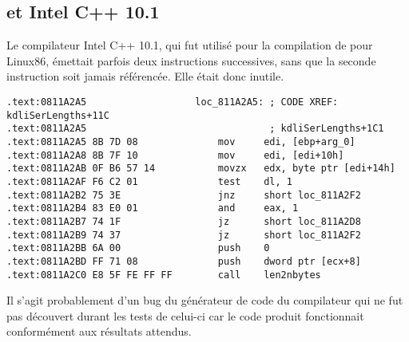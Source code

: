 ﻿
\label{anomaly:Intel}
\myindex{\CompilerAnomaly}

\subsection{ et Intel C++ 10.1}

\myindex{\oracle}

Le compilateur Intel C++ 10.1, qui fut utilisé pour la compilation de  pour Linux86, 
émettait parfois deux instructions \JZ successives, sans que la seconde instruction soit jamais 
référencée. Elle était donc inutile.



\begin{lstlisting}[caption=from the same code,style=customasmx86]
.text:0811A2A5                   loc_811A2A5: ; CODE XREF: kdliSerLengths+11C
.text:0811A2A5                                ; kdliSerLengths+1C1
.text:0811A2A5 8B 7D 08              mov     edi, [ebp+arg_0]
.text:0811A2A8 8B 7F 10              mov     edi, [edi+10h]
.text:0811A2AB 0F B6 57 14           movzx   edx, byte ptr [edi+14h]
.text:0811A2AF F6 C2 01              test    dl, 1
.text:0811A2B2 75 3E                 jnz     short loc_811A2F2
.text:0811A2B4 83 E0 01              and     eax, 1
.text:0811A2B7 74 1F                 jz      short loc_811A2D8
.text:0811A2B9 74 37                 jz      short loc_811A2F2
.text:0811A2BB 6A 00                 push    0
.text:0811A2BD FF 71 08              push    dword ptr [ecx+8]
.text:0811A2C0 E8 5F FE FF FF        call    len2nbytes
\end{lstlisting}

Il s'agit probablement d'un bug du générateur de code du compilateur qui ne fut pas découvert durant 
les tests de celui-ci car le code produit fonctionnait conformément aux résultats attendus.




%

